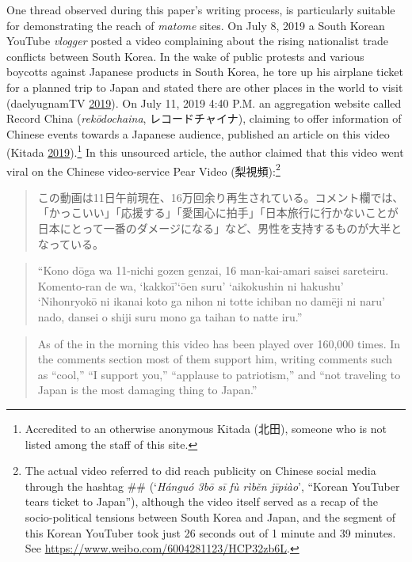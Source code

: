 \documentclass[10pt,british,A4paper,twoside]{memoir}
\begin{document}
One thread observed during this paper's writing process, is particularly
suitable for demonstrating the reach of \emph{matome} sites. On July 8,
2019 a South Korean YouTube \emph{vlogger} posted a video complaining
about the rising nationalist trade conflicts between South Korea. In the
wake of public protests and various boycotts against Japanese products
in South Korea, he tore up his airplane ticket for a planned trip to
Japan and stated there are other places in the world to visit
(daelyugnamTV \protect\hyperlink{ref-daelyugnamtv_eng._2019}{2019}). On
July 11, 2019 4:40 P.M. an aggregation website called Record China
(\emph{rekōdochaina}, レコードチャイナ), claiming to offer information
of Chinese events towards a Japanese audience, published an article on
this video (Kitada
\protect\hyperlink{ref-kitada_eng._2019}{2019}).\footnote{Accredited to
  an otherwise anonymous Kitada (北田), someone who is not listed among
  the staff of this site.} In this unsourced article, the author claimed
that this video went viral on the Chinese video-service Pear Video
(梨視頻):\footnote{The actual video referred to did reach publicity on
  Chinese social media through the hashtag
  \#\# (`\emph{Hánguó \zhu3bō 
  sī fù rìběn jīpiào}', ``Korean YouTuber tears ticket to Japan''),
  although the video itself served as a recap of the socio-political
  tensions between South Korea and Japan, and the segment of this Korean
  YouTuber took just 26 seconds out of 1 minute and 39 minutes. See
  \url{https://www.weibo.com/6004281123/HCP32zb6L}.}

\begin{quote}
この動画は11日午前現在、16万回余り再生されている。コメント欄では、「かっこいい」「応援する」「愛国心に拍手」「日本旅行に行かないことが日本にとって一番のダメージになる」など、男性を支持するものが大半となっている。
\end{quote}

\begin{quote}
``Kono dōga wa 11-nichi gozen genzai, 16 man-kai-amari saisei sareteiru.
Komento-ran de wa, `kakkoī'`ōen suru' `aikokushin ni hakushu'
`Nihonryokō ni ikanai koto ga nihon ni totte ichiban no damēji ni naru'
nado, dansei o shiji suru mono ga taihan to natte iru.''
\end{quote}

\begin{quote}
As of the  in the morning this video has been played over
160,000 times. In the comments section most of them support him, writing
comments such as ``cool,'' ``I support you,'' ``applause to
patriotism,'' and ``not traveling to Japan is the most damaging thing to
Japan.''
\end{quote}
\end{document}
